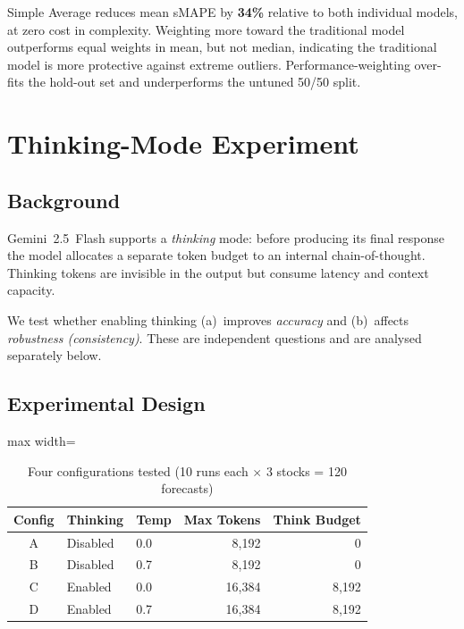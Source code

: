 \documentclass[11pt,a4paper]{article}
\begin{document}
Simple Average reduces mean sMAPE by \textbf{34\%} relative to both individual models,
at zero cost in complexity.  Weighting more toward the traditional model outperforms
equal weights in mean, but not median, indicating the traditional model is more
protective against extreme outliers.  Performance-weighting over-fits the hold-out
set and underperforms the untuned 50/50 split.

\section{Thinking-Mode Experiment}
\label{sec:thinking}

\subsection{Background}

Gemini~2.5~Flash supports a \emph{thinking} mode: before producing its final
response the model allocates a separate token budget to an internal
chain-of-thought.  Thinking tokens are invisible in the output but consume
latency and context capacity.

We test whether enabling thinking (a)~improves \emph{accuracy} and
(b)~affects \emph{robustness (consistency)}.
These are independent questions and are analysed separately below.

\subsection{Experimental Design}

\begin{table}[H]\centering
\caption{Four configurations tested (10 runs each $\times$ 3 stocks = 120 forecasts)}
\label{tab:think_configs}
\begin{adjustbox}{max width=\textwidth}
\begin{tabular}{cllrr}\toprule
\textbf{Config} & \textbf{Thinking} & \textbf{Temp} &
\textbf{Max Tokens} & \textbf{Think Budget}\\\midrule
A & Disabled & 0.0 & 8{,}192  & 0\\
B & Disabled & 0.7 & 8{,}192  & 0\\
C & Enabled  & 0.0 & 16{,}384 & 8{,}192\\
D & Enabled  & 0.7 & 16{,}384 & 8{,}192\\
\bottomrule
\end{tabular}
\end{adjustbox}
\end{table}
\end{document}
